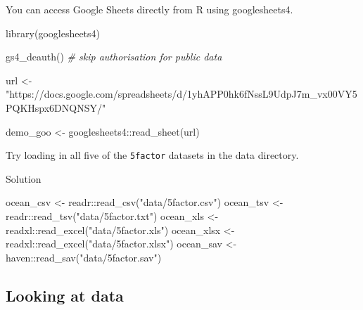 \documentclass[
  oneside]{book}
\newenvironment{Shaded}{\begin{snugshade}}{\end{snugshade}}
\newcommand{\CommentTok}[1]{\textcolor[rgb]{0.56,0.35,0.01}{\textit{#1}}}
\newcommand{\FunctionTok}[1]{\textcolor[rgb]{0.00,0.00,0.00}{#1}}
\newcommand{\NormalTok}[1]{#1}
\newcommand{\OtherTok}[1]{\textcolor[rgb]{0.56,0.35,0.01}{#1}}
\newcommand{\SpecialCharTok}[1]{\textcolor[rgb]{0.00,0.00,0.00}{#1}}
\newcommand{\StringTok}[1]{\textcolor[rgb]{0.31,0.60,0.02}{#1}}
\begin{document}
You can access Google Sheets directly from R using googlesheets4.

\begin{Shaded}
\begin{Highlighting}[]
\FunctionTok{library}\NormalTok{(googlesheets4)}

\FunctionTok{gs4\_deauth}\NormalTok{() }\CommentTok{\# skip authorisation for public data}

\NormalTok{url }\OtherTok{\textless{}{-}} \StringTok{"https://docs.google.com/spreadsheets/d/1yhAPP0hk6fNssL9UdpJ7m\_vx00VY5PQKHspx6DNQNSY/"}

\NormalTok{demo\_goo  }\OtherTok{\textless{}{-}}\NormalTok{ googlesheets4}\SpecialCharTok{::}\FunctionTok{read\_sheet}\NormalTok{(url)}
\end{Highlighting}
\end{Shaded}

\begin{try}

Try loading in all five of the \texttt{5factor} datasets in the data directory.

Solution

\begin{Shaded}
\begin{Highlighting}[]
\NormalTok{ocean\_csv  }\OtherTok{\textless{}{-}}\NormalTok{ readr}\SpecialCharTok{::}\FunctionTok{read\_csv}\NormalTok{(}\StringTok{"data/5factor.csv"}\NormalTok{)}
\NormalTok{ocean\_tsv  }\OtherTok{\textless{}{-}}\NormalTok{ readr}\SpecialCharTok{::}\FunctionTok{read\_tsv}\NormalTok{(}\StringTok{"data/5factor.txt"}\NormalTok{)}
\NormalTok{ocean\_xls  }\OtherTok{\textless{}{-}}\NormalTok{ readxl}\SpecialCharTok{::}\FunctionTok{read\_excel}\NormalTok{(}\StringTok{"data/5factor.xls"}\NormalTok{)}
\NormalTok{ocean\_xlsx }\OtherTok{\textless{}{-}}\NormalTok{ readxl}\SpecialCharTok{::}\FunctionTok{read\_excel}\NormalTok{(}\StringTok{"data/5factor.xlsx"}\NormalTok{)}
\NormalTok{ocean\_sav  }\OtherTok{\textless{}{-}}\NormalTok{ haven}\SpecialCharTok{::}\FunctionTok{read\_sav}\NormalTok{(}\StringTok{"data/5factor.sav"}\NormalTok{)}
\end{Highlighting}
\end{Shaded}

\end{try}

\hypertarget{looking-at-data}{%
\subsection{Looking at data}\label{looking-at-data}}
\end{document}
